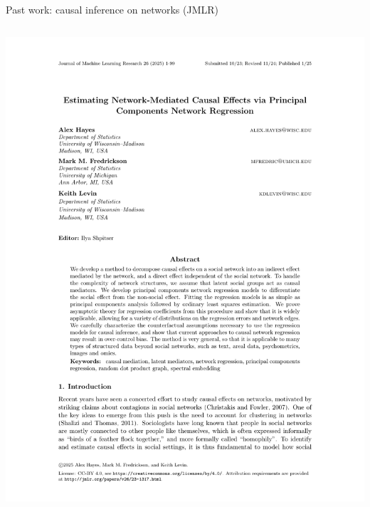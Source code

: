 \documentclass[aspectratio=169]{beamer}
\theoremstyle{remark}
\begin{document}
\begin{frame}{Past work: causal inference on networks (JMLR)}
\begin{columns}
\begin{column}{0.5\textwidth}
            \includegraphics[width=1.2\textwidth, page=1, trim={2cm 8.8cm 0 3cm}, clip]{./papers/mediation.pdf}
        \end{column}
    \end{columns}
\end{frame}
\end{document}
